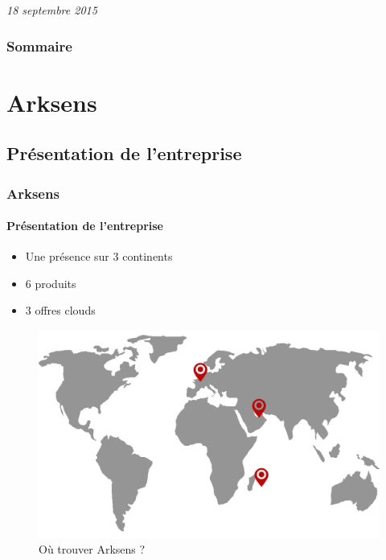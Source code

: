 \documentclass{beamer}
\begin{document}
\begin{frame}
  \begin{center}
    \emph{18 septembre 2015}
  \end{center}
    
\end{frame}

\begin{frame}
 \frametitle{Sommaire}
 \tableofcontents
\end{frame}

\section{Arksens}
\subsection{Pr\'esentation de l'entreprise}
\begin{frame}
 \frametitle{Arksens}
 \framesubtitle{Pr\'esentation de l'entreprise}
 \begin{minipage}{0.49\textwidth}
  \begin{itemize}
    \item Une pr\'esence sur 3 continents
    \item 6 produits
    \item 3 offres clouds
  \end{itemize}
 \end{minipage}
 \begin{minipage}{0.49\textwidth}
  \begin{figure}[h!]
    \centering
    \includegraphics[scale=0.13]{map_arksens.png}
    \caption{O\`u trouver Arksens ?}
  \end{figure}
 \end{minipage}
\end{frame}
\end{document}
